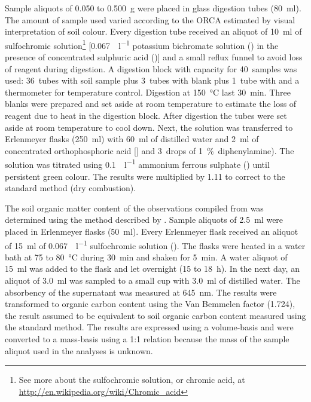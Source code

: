 Sample aliquots of \num{0.050} to \SI{0.500}{\gram} were placed in glass digestion tubes 
(\SI{80}{\milli\litre}). The amount of sample used varied according to the ORCA estimated by visual 
interpretation of soil colour. Every digestion tube received an aliquot of \SI{10}{\milli\litre} of 
sulfochromic solution\footnote{See more about the sulfochromic solution, or chromic acid, at
\url{http://en.wikipedia.org/wiki/Chromic_acid}} [\SI{0.067}{\molle\per\litre} potassium bichromate solution
() in the presence of concentrated sulphuric acid ()] and a small reflux funnel 
to avoid loss of reagent during digestion. A digestion block with capacity for \num{40}~samples was used:
\num{36}~tubes with soil sample plus \num{3}~tubes with blank plus \num{1}~tube with  and a
thermometer for temperature control. Digestion at \SI{150}{\celsius} last \SI{30}{\minute}. Three blanks 
were prepared and set aside at room temperature to estimate the loss of reagent due to heat in the digestion 
block. After digestion the tubes were set aside at room temperature to cool down. Next, the solution was 
transferred to Erlenmeyer flasks (\SI{250}{\milli\litre}) with \SI{60}{\milli\litre} of distilled water and
\SI{2}{\milli\litre} of concentrated orthophosphoric acid [] and \num{3}~drops of 
\SI{1}{\percent}~diphenylamine). The solution was titrated using \SI{0.1}{\molle\per\litre} ammonium ferrous
sulphate () until persistent green colour. The results were multiplied by \num{1.11}
to correct to the standard method (dry combustion).

The soil organic matter content of the observations compiled from  was determined 
using the method described by . Sample aliquots of \SI{2.5}{\milli\litre}
were placed in Erlenmeyer flasks (\SI{50}{\milli\litre}). Every Erlenmeyer flask received an aliquot of 
\SI{15}{\milli\litre} of \SI{0.067}{\molle\per\litre} sulfochromic solution (). The 
flasks were heated in a water bath at \num{75} to \SI{80}{\celsius} during \SI{30}{\minute} and shaken 
for \SI{5}{\minute}. A water aliquot of \SI{15}{\milli\litre} was added to the flask and let overnight 
(\num{15} to \SI{18}{\hour}). In the next day, an aliquot of \SI{3.0}{\milli\litre} was sampled to a 
small cup with \SI{3.0}{\milli\litre} of distilled water. The absorbency of the supernatant was measured 
at \SI{645}{\nano\metre}. The results were transformed to organic carbon content using the Van Bemmelen 
factor (\num{1.724}), the result assumed to be equivalent to soil organic carbon content measured using the 
standard method. The results are expressed using a volume-basis and were converted to a mass-basis using a
1:1 relation because the mass of the sample aliquot used in the analyses is unknown.

